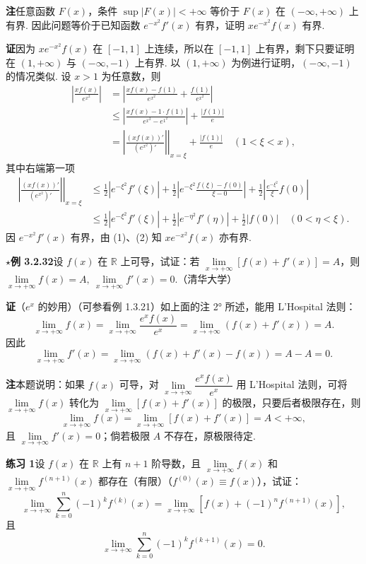 \documentclass[UTF8,12pt,a4paper,fontset=fandol]{ctexart}
\begin{document}
\noindent\textbf{注}\quad 任意函数 $F(x)$，条件 $\sup |F(x)|<+\infty$ 等价于 $F(x)$ 在 $(-\infty,+\infty)$ 上有界. 因此问题等价于已知函数 $e^{-x^2}f'(x)$ 有界，证明 $xe^{-x^2}f(x)$ 有界.

\noindent\textbf{证}\quad 因为 $xe^{-x^2}f(x)$ 在 $[-1,1]$ 上连续，所以在 $[-1,1]$ 上有界，剩下只要证明在 $(1,+\infty)$ 与 $(-\infty,-1)$ 上有界. 以 $(1,+\infty)$ 为例进行证明，$(-\infty,-1)$ 的情况类似. 设 $x>1$ 为任意数，则
\[
\begin{aligned}
  \left|\frac{xf(x)}{e^{x^2}}\right|
  &=
  \left|\frac{xf(x)-f(1)}{e^{x^2}}+\frac{f(1)}{e^{x^2}}\right|  \\
  &\le
  \left|\frac{xf(x)-1\cdot f(1)}{e^{x^2}-e^{1^2}}\right|+\frac{|f(1)|}{e}  \\
  &=
  \left.\left|\frac{(xf(x))'}{(e^{x^2})'}\right|\right|_{x=\xi}+\frac{|f(1)|}{e}
  \quad(1<\xi<x),
\end{aligned}
\tag{1}
\]
其中右端第一项
\[
\begin{aligned}
  \left.\left|\frac{(xf(x))'}{(e^{x^2})'}\right|\right|_{x=\xi}
  &\le \frac12|e^{-\xi^2}f'(\xi)|
  +\frac12\left|e^{-\xi^2}\frac{f(\xi)-f(0)}{\xi-0}\right|
  +\frac12\left|\frac{e^{-\xi^2}}{\xi}f(0)\right| \\
  &\le \frac12|e^{-\xi^2}f'(\xi)|
  +\frac12|e^{-\eta^2}f'(\eta)|+\frac12|f(0)|
  \quad(0<\eta<\xi).
\end{aligned}
\tag{2}
\]
因 $e^{-x^2}f'(x)$ 有界，由 (1)、(2) 知 $xe^{-x^2}f(x)$ 亦有界.

\noindent\textbf{$\star$例 3.2.32}\quad 设 $f(x)$ 在 $\mathbb{R}$ 上可导，试证：若 $\lim\limits_{x\to+\infty}[f(x)+f'(x)]=A$，则 $\lim\limits_{x\to+\infty}f(x)=A,\ \lim\limits_{x\to+\infty}f'(x)=0$.（清华大学）

\noindent\textbf{证}\quad （$e^x$ 的妙用）（可参看例 1.3.21）如上面的注 2° 所述，能用 L'Hospital 法则：
\[
  \lim_{x\to+\infty}f(x)
  =
  \lim_{x\to+\infty}\frac{e^xf(x)}{e^x}
  =
  \lim_{x\to+\infty}(f(x)+f'(x))=A.
\]
因此
\[
  \lim_{x\to+\infty}f'(x)
  =
  \lim_{x\to+\infty}(f(x)+f'(x)-f(x))=A-A=0.
\]

\noindent\textbf{注}\quad 本题说明：如果 $f(x)$ 可导，对 $\lim\limits_{x\to+\infty}\dfrac{e^xf(x)}{e^x}$ 用 L'Hospital 法则，可将 $\lim\limits_{x\to+\infty}f(x)$ 转化为 $\lim\limits_{x\to+\infty}[f(x)+f'(x)]$ 的极限，只要后者极限存在，则
\[
  \lim_{x\to+\infty}f(x)=\lim_{x\to+\infty}[f(x)+f'(x)]=A<+\infty,
\]
且 $\lim\limits_{x\to+\infty}f'(x)=0$；倘若极限 $A$ 不存在，原极限待定.

\noindent\textbf{练习 1}\quad 设 $f(x)$ 在 $\mathbb{R}$ 上有 $n+1$ 阶导数，且 $\lim\limits_{x\to+\infty}f(x)$ 和 $\lim\limits_{x\to+\infty}f^{(n+1)}(x)$ 都存在（有限）（$f^{(0)}(x)\equiv f(x)$），试证：
\[
  \lim_{x\to+\infty}\sum_{k=0}^{n}(-1)^kf^{(k)}(x)
  =
  \lim_{x\to+\infty}[f(x)+(-1)^nf^{(n+1)}(x)],
\]
且
\[
  \lim_{x\to+\infty}\sum_{k=0}^{n}(-1)^kf^{(k+1)}(x)=0.
\]
\end{document}
